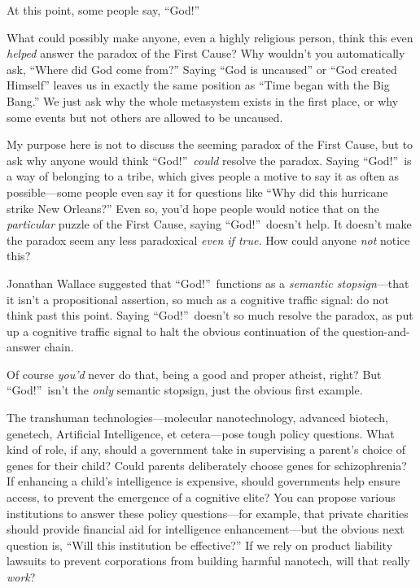 {
 At this point, some people say,
``God!''}

{
 What could possibly make anyone, even a highly religious person,
think this even \textit{helped} answer the paradox of the First Cause?
Why wouldn't you automatically ask,
``Where did God come from?'' Saying
``God is uncaused'' or
``God created Himself'' leaves us in
exactly the same position as ``Time began with the Big
Bang.'' We just ask why the whole metasystem exists
in the first place, or why some events but not others are allowed to be
uncaused.}

{
 My purpose here is not to discuss the seeming paradox of the First
Cause, but to ask why anyone would think
``God!''~\textit{could} resolve the
paradox. Saying ``God!''~is a way of
belonging to a tribe, which gives people a motive to say it as often as
possible---some people even say it for questions like
``Why did this hurricane strike New
Orleans?'' Even so, you'd hope people
would notice that on the \textit{particular} puzzle of the First Cause,
saying ``God!''~doesn't help. It doesn't make the
paradox seem any less paradoxical \textit{even if true.} How could
anyone \textit{not} notice this?}

{
 Jonathan Wallace suggested that
``God!''~functions as a
\textit{semantic stopsign}{}---that it isn't a
propositional assertion, so much as a cognitive traffic signal: do not
think past this point. Saying
``God!''~doesn't so
much resolve the paradox, as put up a cognitive traffic signal to halt
the obvious continuation of the question-and-answer chain.}

{
 Of course \textit{you'd} never do that, being a
good and proper atheist, right? But
``God!''~isn't the
\textit{only} semantic stopsign, just the obvious first example.}

{
 The transhuman technologies---molecular nanotechnology, advanced
biotech, genetech, Artificial Intelligence, et cetera---pose tough
policy questions. What kind of role, if any, should a government take
in supervising a parent's choice of genes for their
child? Could parents deliberately choose genes for schizophrenia? If
enhancing a child's intelligence is expensive, should
governments help ensure access, to prevent the emergence of a cognitive
elite? You can propose various institutions to answer these policy
questions---for example, that private charities should provide
financial aid for intelligence enhancement---but the obvious next
question is, ``Will this institution be
effective?'' If we rely on product liability lawsuits
to prevent corporations from building harmful nanotech, will that
really \textit{work}?}

